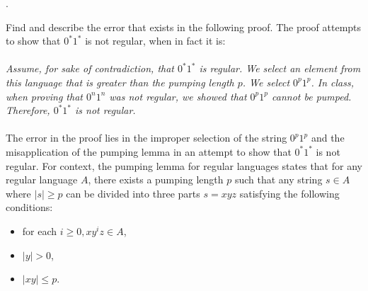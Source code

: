 \documentclass[12pt]{article}
\newcounter{quesnum}
\newcommand{\question}[2][??]{
\begin{list}{\labelitemi}{\leftmargin=2em}
\item [\arabic{quesnum}.] {} {#2}
\end{list}
\addtocounter{quesnum}{1}
}
\begin{document}
\vspace{12pt}

\question[3]{
Find and describe the error that exists in the following proof. The proof attempts to show that $0^*1^*$ is not regular, when in fact it is:
\\
\\
\emph{
Assume, for sake of contradiction, that $0^*1^*$ is regular. We select an element from this language that is greater than the pumping length $p$. We select $0^p1^p$. In class, when proving that $0^n1^n$ was not regular, we showed that $0^p1^p$ cannot be pumped. Therefore, $0^*1^*$ is not regular.
}
\\
\\
The error in the proof lies in the improper selection of the string $0^p1^p$ and the misapplication of the pumping lemma in an attempt to show that $0^*1^*$ is not regular. For context, the pumping lemma for regular languages states that for any regular language $A$, there exists a pumping length $p$ such that any string $s \in A$ where $|s| \geq p$ can be divided into three parts $s = xyz$ satisfying the following conditions:
\begin{itemize}
    \item for each $i \geq 0, xy^iz \in A$,
    \item $|y| > 0$,
    \item $|xy| \leq p$.
\end{itemize}

}
\end{document}
